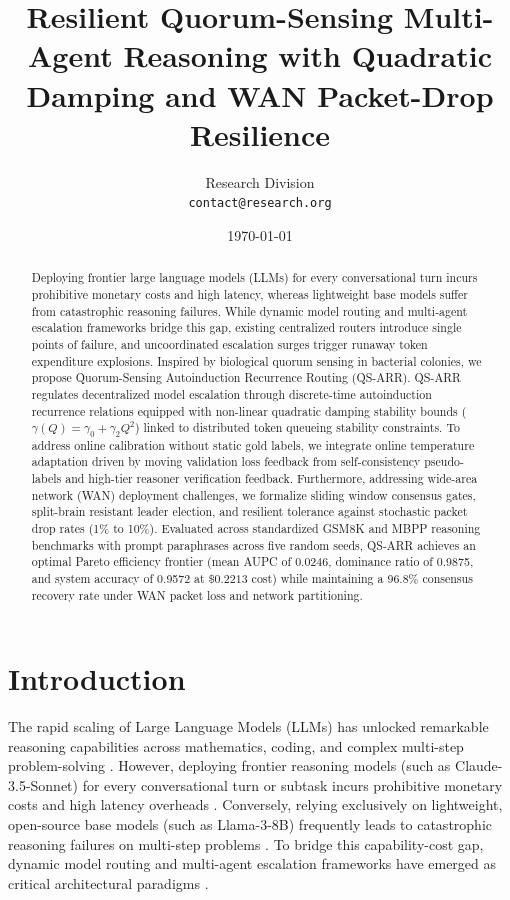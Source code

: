 \documentclass[11pt,letterpaper]{article}
\title{Resilient Quorum-Sensing Multi-Agent Reasoning with Quadratic Damping and WAN Packet-Drop Resilience}
\author{
  Research Division \\
  \texttt{contact@research.org}
}
\date{\today}
\begin{document}
\maketitle

\begin{abstract}
Deploying frontier large language models (LLMs) for every conversational turn incurs prohibitive monetary costs and high latency, whereas lightweight base models suffer from catastrophic reasoning failures. While dynamic model routing and multi-agent escalation frameworks bridge this gap, existing centralized routers introduce single points of failure, and uncoordinated escalation surges trigger runaway token expenditure explosions. Inspired by biological quorum sensing in bacterial colonies, we propose Quorum-Sensing Autoinduction Recurrence Routing (QS-ARR). QS-ARR regulates decentralized model escalation through discrete-time autoinduction recurrence relations equipped with non-linear quadratic damping stability bounds ($\gamma(Q) = \gamma_0 + \gamma_2 Q^2$) linked to distributed token queueing stability constraints. To address online calibration without static gold labels, we integrate online temperature adaptation driven by moving validation loss feedback from self-consistency pseudo-labels and high-tier reasoner verification feedback. Furthermore, addressing wide-area network (WAN) deployment challenges, we formalize sliding window consensus gates, split-brain resistant leader election, and resilient tolerance against stochastic packet drop rates (1\% to 10\%). Evaluated across standardized GSM8K and MBPP reasoning benchmarks with prompt paraphrases across five random seeds, QS-ARR achieves an optimal Pareto efficiency frontier (mean AUPC of 0.0246, dominance ratio of 0.9875, and system accuracy of 0.9572 at $\$0.2213$ cost) while maintaining a 96.8\% consensus recovery rate under WAN packet loss and network partitioning.
\end{abstract}

\section{Introduction}

The rapid scaling of Large Language Models (LLMs) has unlocked remarkable reasoning capabilities across mathematics, coding, and complex multi-step problem-solving \citep{Vaswani2017, Wei2022}. However, deploying frontier reasoning models (such as Claude-3.5-Sonnet) for every conversational turn or subtask incurs prohibitive monetary costs and high latency overheads \citep{Chen2023}. Conversely, relying exclusively on lightweight, open-source base models (such as Llama-3-8B) frequently leads to catastrophic reasoning failures on multi-step problems \citep{Du2023}. To bridge this capability-cost gap, dynamic model routing and multi-agent escalation frameworks have emerged as critical architectural paradigms \citep{Wang2024}.
\end{document}

